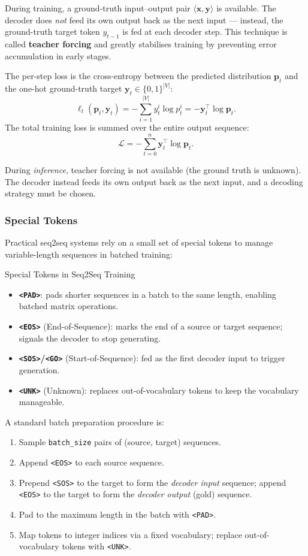 \documentclass[11pt,a4paper]{article}
\newcommand{\term}[1]{\textcolor{DefGreen}{\textbf{#1}}\index{#1}}
\begin{document}
During training, a ground-truth input--output pair $\langle \mathbf{x}, \mathbf{y} \rangle$ is available. The decoder does \emph{not} feed its own output back as the next input — instead, the ground-truth target token $y_{t-1}$ is fed at each decoder step. This technique is called \term{teacher forcing} and greatly stabilises training by preventing error accumulation in early stages.

The per-step loss is the cross-entropy between the predicted distribution $\mathbf{p}_t$ and the one-hot ground-truth target $\mathbf{y}_t \in \{0,1\}^{|V|}$:
\[
  \ell_t(\mathbf{p}_t, \mathbf{y}_t) = -\sum_{i=1}^{|V|} y_t^i \log p_t^i = -\mathbf{y}_t^\top \log \mathbf{p}_t.
\]
The total training loss is summed over the entire output sequence:
\[
  \mathcal{L} = -\sum_{t=0}^{n} \mathbf{y}_t^\top \log \mathbf{p}_t.
\]

During \emph{inference}, teacher forcing is not available (the ground truth is unknown). The decoder instead feeds its own output back as the next input, and a decoding strategy must be chosen.

\subsubsection{Special Tokens}

Practical seq2seq systems rely on a small set of special tokens to manage variable-length sequences in batched training:

\begin{defbox}{Special Tokens in Seq2Seq Training}
\begin{itemize}
  \item \textbf{\texttt{<PAD>}}: pads shorter sequences in a batch to the same length, enabling batched matrix operations.
  \item \textbf{\texttt{<EOS>}} (End-of-Sequence): marks the end of a source or target sequence; signals the decoder to stop generating.
  \item \textbf{\texttt{<SOS>}/\texttt{<GO>}} (Start-of-Sequence): fed as the first decoder input to trigger generation.
  \item \textbf{\texttt{<UNK>}} (Unknown): replaces out-of-vocabulary tokens to keep the vocabulary manageable.
\end{itemize}
\end{defbox}

A standard batch preparation procedure is:
\begin{enumerate}
  \item Sample \texttt{batch\_size} pairs of (source, target) sequences.
  \item Append \texttt{<EOS>} to each source sequence.
  \item Prepend \texttt{<SOS>} to the target to form the \emph{decoder input} sequence; append \texttt{<EOS>} to the target to form the \emph{decoder output} (gold) sequence.
  \item Pad to the maximum length in the batch with \texttt{<PAD>}.
  \item Map tokens to integer indices via a fixed vocabulary; replace out-of-vocabulary tokens with \texttt{<UNK>}.
\end{enumerate}
\end{document}
